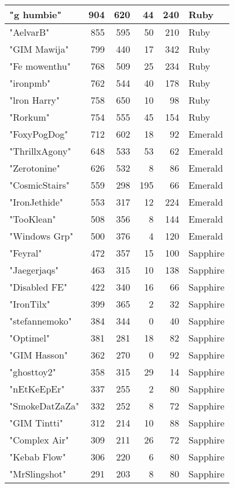 \documentclass{article}
\begin{document}
\begin{table}[htbp]
\begin{tabular}{|l|r|r|r|r|l|}
"g humbie" & 904 & 620 & 44 & 240 & Ruby \\ \hline
"AelvarB" & 855 & 595 & 50 & 210 & Ruby \\ \hline
"GIM Mawija" & 799 & 440 & 17 & 342 & Ruby \\ \hline
"Fe mowenthu" & 768 & 509 & 25 & 234 & Ruby \\ \hline
"ironpmb" & 762 & 544 & 40 & 178 & Ruby \\ \hline
"lron Harry" & 758 & 650 & 10 & 98 & Ruby \\ \hline
"Rorkum" & 754 & 555 & 45 & 154 & Ruby \\ \hline
"FoxyPogDog" & 712 & 602 & 18 & 92 & Emerald \\ \hline
"ThrillxAgony" & 648 & 533 & 53 & 62 & Emerald \\ \hline
"Zerotonine" & 626 & 532 & 8 & 86 & Emerald \\ \hline
"CosmicStairs" & 559 & 298 & 195 & 66 & Emerald \\ \hline
"IronJethide" & 553 & 317 & 12 & 224 & Emerald \\ \hline
"TooKlean" & 508 & 356 & 8 & 144 & Emerald \\ \hline
"Windows Grp" & 500 & 376 & 4 & 120 & Emerald \\ \hline
"Feyral" & 472 & 357 & 15 & 100 & Sapphire \\ \hline
"Jaegerjaqs" & 463 & 315 & 10 & 138 & Sapphire \\ \hline
"Disabled FE" & 422 & 340 & 16 & 66 & Sapphire \\ \hline
"IronTilx" & 399 & 365 & 2 & 32 & Sapphire \\ \hline
"stefannemoko" & 384 & 344 & 0 & 40 & Sapphire \\ \hline
"Optimel" & 381 & 281 & 18 & 82 & Sapphire \\ \hline
"GIM Hasson" & 362 & 270 & 0 & 92 & Sapphire \\ \hline
"ghosttoy2" & 358 & 315 & 29 & 14 & Sapphire \\ \hline
"nEtKeEpEr" & 337 & 255 & 2 & 80 & Sapphire \\ \hline
"SmokeDatZaZa" & 332 & 252 & 8 & 72 & Sapphire \\ \hline
"GIM Tintti" & 312 & 214 & 10 & 88 & Sapphire \\ \hline
"Complex Air" & 309 & 211 & 26 & 72 & Sapphire \\ \hline
"Kebab Flow" & 306 & 220 & 6 & 80 & Sapphire \\ \hline
"MrSlingshot" & 291 & 203 & 8 & 80 & Sapphire \\ \hline

\end{tabular}
\end{table}
\end{document}
